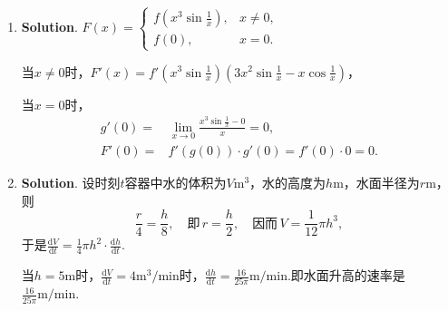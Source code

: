 \documentclass[../main.tex]{subfiles}
\begin{document}
\begin{enumerate}
    \item \textbf{Solution}. $F(x)=
              \begin{cases}
                  f\left(x^{3}\sin\frac{1}{x}\right), & x\neq0, \\
                  f(0),                               & x=0.
              \end{cases}$

          当$x\neq0$时，$F'(x)=f'\left(x^{3}\sin\frac{1}{x}\right)\left(3x^{2}\sin\frac{1}{x}
              -x\cos\frac{1}{x}\right)$，

          当$x=0$时，
          \[
              \begin{aligned}
                  g'(0)= {}  & \lim_{x\to0}\frac{x^3\sin\frac{1}{x}-0}{x}=0, \\
                  F'(0) = {} & f'\left(g(0)\right)\cdot g'(0)=f'(0)\cdot0=0.
              \end{aligned}
          \]

    \item \textbf{Solution}. 设时刻$t$容器中水的体积为$V\mathrm{m}^{3}$，水的高度为$h
              \mathrm{m}$，水面半径为$r\mathrm{m}$，则
          \[
              \frac{r}{4}=\frac{h}{8},\quad\text{即}\,r=\frac{h}{2},\quad\text{因而}\,V
              =\frac{1}{12}\pi h^{3},
          \]
          于是$\frac{\mathrm{d}V}{\mathrm{d}t}=\frac{1}{4}\pi h^{2}\cdot\frac{\mathrm{d}h}{\mathrm{d}t}$.

          当$h=5\mathrm{m}$时，$\frac{\mathrm{d}V}{\mathrm{d}t}=4\mathrm{m}^{3}/\mathrm{min}$时，$\frac{\mathrm{d}h}{\mathrm{d}t}
              =\frac{16}{25\pi}\mathrm{m}/\mathrm{min}$.即水面升高的速率是$\frac{16}{25\pi}\mathrm{m}/\mathrm{min}$.
\end{enumerate}
\end{document}
